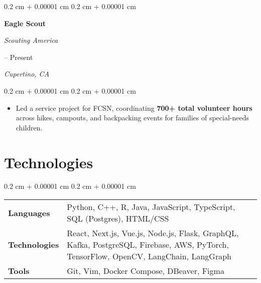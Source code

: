 \documentclass[10pt, letterpaper]{article}
\newenvironment{highlights}{
    \begin{itemize}[
        topsep=0.10 cm,
        parsep=0.10 cm,
        partopsep=0pt,
        itemsep=0pt,
        leftmargin=0.4 cm + 10pt
    ]
}{
    \end{itemize}
} %
\newenvironment{onecolentry}{
    \begin{adjustwidth}{
        0.2 cm + 0.00001 cm
    }{
        0.2 cm + 0.00001 cm
    }
}{
    \end{adjustwidth}
} %
\newenvironment{twocolentry}[2][]{
    \onecolentry
    \def\secondColumn{#2}
    \setcolumnwidth{\fill, 5.6 cm}
    \begin{paracol}{2}
}{
    \switchcolumn \raggedleft \secondColumn
    \end{paracol}
    \endonecolentry
} %
\begin{document}
        \begin{twocolentry}{
        2012 -- Present    
            
        \textit{Cupertino, CA}}
            \textbf{Eagle Scout}
            
            \textit{Scouting America}
        \end{twocolentry}

        \vspace{0.10 cm}
        \begin{onecolentry}
            \begin{highlights}
                \item Led a service project for FCSN, coordinating \textbf{700+ total volunteer hours} across hikes, campouts, and backpacking events for families of special-needs children.
            \end{highlights}
        \end{onecolentry}


    \section{Technologies}
    
        \begin{onecolentry}
            \begin{tabularx}{\textwidth}{@{}p{2.15cm}Y@{}}
                \textbf{Languages} & Python, C++, R, Java, JavaScript, TypeScript, SQL (Postgres), HTML/CSS \\[0.2cm]
                \textbf{Technologies} & React, Next.js, Vue.js, Node.js, Flask, GraphQL, Kafka, PostgreSQL, Firebase, AWS, PyTorch, TensorFlow, OpenCV, LangChain, LangGraph \\[0.6cm]
                \textbf{Tools} & Git, Vim, Docker Compose, DBeaver, Figma
            \end{tabularx}
        \end{onecolentry}
\end{document}

